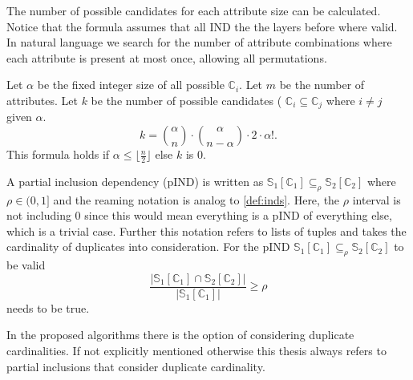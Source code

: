 The number of possible candidates for each attribute size can be calculated. Notice that the formula assumes that all IND the the layers before where valid. In natural language we search for the number of attribute combinations where each attribute is present at most once, allowing all permutations.
\begin{definition}\label{def:candidates}
    Let $\alpha$ be the fixed integer size of all possible $\mathbb{C}_i$. Let $m$ be the number of attributes. Let $k$ be the number of possible candidates ( $\mathbb{C}_i \subseteq \mathbb{C}_j$ where $i \not = j$ given $\alpha$.
    $$
        k = \binom{\alpha}{n} \cdot \binom{\alpha}{n-\alpha} \cdot 2 \cdot \alpha!.
    $$
    This formula holds if $\alpha \leq \lfloor \frac{n}{2} \rfloor$ else $k$ is $0$.
\end{definition}

\begin{definition}\label{def:pinds}
    A partial inclusion dependency (pIND) is written as $\mathbb{S}_1[\mathbb{C}_1] \subseteq_{\rho} \mathbb{S}_2[\mathbb{C}_2]$ where $\rho \in (0, 1]$ and the reaming notation is analog to \ref{def:inds}. Here, the $\rho$ interval is not including $0$ since this would mean everything is a pIND of everything else, which is a trivial case. Further this notation refers to lists of tuples and takes the cardinality of duplicates into consideration. For the pIND $\mathbb{S}_1[\mathbb{C}_1] \subseteq_{\rho} \mathbb{S}_2[\mathbb{C}_2]$ to be valid
    $$
        \frac{|\mathbb{S}_1[\mathbb{C}_1] \cap \mathbb{S}_2[\mathbb{C}_2]|}
            {|\mathbb{S}_1[\mathbb{C}_1]|} \geq \rho
    $$
    needs to be true.
\end{definition}

In the proposed algorithms there is the option of considering duplicate cardinalities. If not explicitly mentioned otherwise this thesis always refers to partial inclusions that consider duplicate cardinality.

